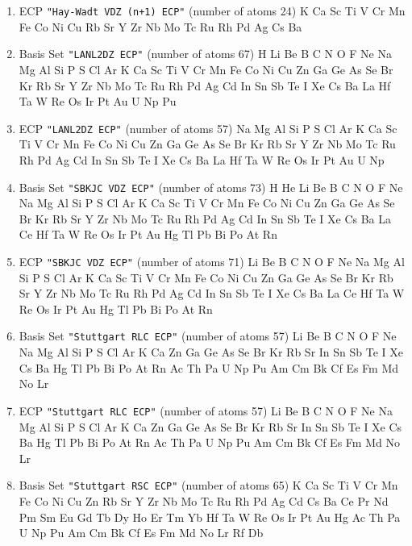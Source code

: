 \begin{enumerate}
\item ECP \verb#"Hay-Wadt VDZ (n+1) ECP"# (number of atoms 24) \newline
  K Ca Sc Ti V Cr Mn Fe Co Ni Cu Rb Sr Y Zr Nb Mo Tc Ru Rh Pd Ag Cs Ba


\item Basis Set \verb#"LANL2DZ ECP"# (number of atoms 67) \newline
  H Li Be B C N O F Ne Na Mg Al Si P S Cl Ar K Ca Sc Ti V Cr Mn Fe
 Co Ni Cu Zn Ga Ge As Se Br Kr Rb Sr Y Zr Nb Mo Tc Ru Rh Pd Ag Cd In Sn Sb
 Te I Xe Cs Ba La Hf Ta W Re Os Ir Pt Au U Np Pu


\item ECP \verb#"LANL2DZ ECP"# (number of atoms 57) \newline
  Na Mg Al Si P S Cl Ar K Ca Sc Ti V Cr Mn Fe Co Ni Cu Zn Ga Ge As Se Br
 Kr Rb Sr Y Zr Nb Mo Tc Ru Rh Pd Ag Cd In Sn Sb Te I Xe Cs Ba La Hf Ta W
 Re Os Ir Pt Au U Np


\item Basis Set \verb#"SBKJC VDZ ECP"# (number of atoms 73) \newline
  H He Li Be B C N O F Ne Na Mg Al Si P S Cl Ar K Ca Sc Ti V Cr Mn
 Fe Co Ni Cu Zn Ga Ge As Se Br Kr Rb Sr Y Zr Nb Mo Tc Ru Rh Pd Ag Cd In Sn
 Sb Te I Xe Cs Ba La Ce Hf Ta W Re Os Ir Pt Au Hg Tl Pb Bi Po At Rn


\item ECP \verb#"SBKJC VDZ ECP"# (number of atoms 71) \newline
  Li Be B C N O F Ne Na Mg Al Si P S Cl Ar K Ca Sc Ti V Cr Mn Fe Co
 Ni Cu Zn Ga Ge As Se Br Kr Rb Sr Y Zr Nb Mo Tc Ru Rh Pd Ag Cd In Sn Sb Te
 I Xe Cs Ba La Ce Hf Ta W Re Os Ir Pt Au Hg Tl Pb Bi Po At Rn


\item Basis Set \verb#"Stuttgart RLC ECP"# (number of atoms 57) \newline
  Li Be B C N O F Ne Na Mg Al Si P S Cl Ar K Ca Zn Ga Ge As Se Br Kr
 Rb Sr In Sn Sb Te I Xe Cs Ba Hg Tl Pb Bi Po At Rn Ac Th Pa U Np Pu Am Cm
 Bk Cf Es Fm Md No Lr


\item ECP \verb#"Stuttgart RLC ECP"# (number of atoms 57) \newline
  Li Be B C N O F Ne Na Mg Al Si P S Cl Ar K Ca Zn Ga Ge As Se Br Kr
 Rb Sr In Sn Sb Te I Xe Cs Ba Hg Tl Pb Bi Po At Rn Ac Th Pa U Np Pu Am Cm
 Bk Cf Es Fm Md No Lr


\item Basis Set \verb#"Stuttgart RSC ECP"# (number of atoms 65) \newline
  K Ca Sc Ti V Cr Mn Fe Co Ni Cu Zn Rb Sr Y Zr Nb Mo Tc Ru Rh Pd Ag Cd Cs
 Ba Ce Pr Nd Pm Sm Eu Gd Tb Dy Ho Er Tm Yb Hf Ta W Re Os Ir Pt Au Hg Ac Th
 Pa U Np Pu Am Cm Bk Cf Es Fm Md No Lr Rf Db



\end{enumerate}
